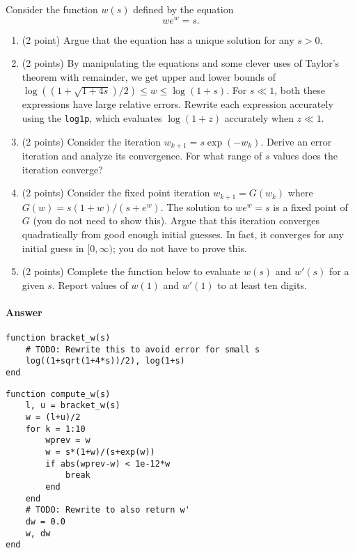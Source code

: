 \documentclass[12pt, leqno]{article} %
\providecommand{\tightlist}{%
  \setlength{\itemsep}{0pt}\setlength{\parskip}{0pt}}
\begin{document}
Consider the function \(w(s)\) defined by the equation \[we^w = s.\]

\begin{enumerate}
\def\labelenumi{\arabic{enumi}.}
\tightlist
\item
  (2 point) Argue that the equation has a unique solution for any
  \(s > 0\).
\item
  (2 points) By manipulating the equations and some clever uses of
  Taylor's theorem with remainder, we get upper and lower bounds of
  \(\log((1+\sqrt{1+4s})/2) \leq w \leq \log(1+s)\). For \(s \ll 1\),
  both these expressions have large relative errors. Rewrite each
  expression accurately using the \texttt{log1p}, which evaluates
  \(\log(1+z)\) accurately when \(z \ll 1\).
\item
  (2 points) Consider the iteration \(w_{k+1} = s \exp(-w_k)\). Derive
  an error iteration and analyze its convergence. For what range of
  \(s\) values does the iteration converge?
\item
  (2 points) Consider the fixed point iteration \(w_{k+1} = G(w_k)\)
  where \(G(w) = s(1+w)/(s+e^w)\). The solution to \(we^w = s\) is a
  fixed point of \(G\) (you do not need to show this). Argue that this
  iteration converges quadratically from good enough initial guesses. In
  fact, it converges for any initial guess in \([0,\infty)\); you do not
  have to prove this.
\item
  (2 points) Complete the function below to evaluate \(w(s)\) and
  \(w'(s)\) for a given \(s\). Report values of \(w(1)\) and \(w'(1)\)
  to at least ten digits.
\end{enumerate}

\paragraph{Answer}

\begin{verbatim}
function bracket_w(s)
    # TODO: Rewrite this to avoid error for small s
    log((1+sqrt(1+4*s))/2), log(1+s)
end
\end{verbatim}

\begin{verbatim}
function compute_w(s)
    l, u = bracket_w(s)
    w = (l+u)/2
    for k = 1:10
        wprev = w
        w = s*(1+w)/(s+exp(w))
        if abs(wprev-w) < 1e-12*w
            break
        end
    end
    # TODO: Rewrite to also return w'
    dw = 0.0
    w, dw
end
\end{verbatim}
\end{document}

